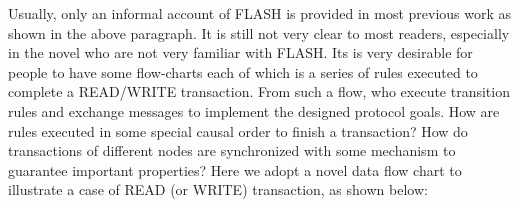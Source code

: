 \documentclass{llncs}
\begin{document}

%

Usually, only an informal  account of FLASH is provided in most previous work as shown in the above paragraph.   It is still not very clear to most readers, especially in the novel who are not very familiar with FLASH. Its is very desirable for people to have some flow-charts each of  which is a series of rules executed to complete a READ/WRITE transaction. From such a flow, who execute transition rules and exchange messages to implement the designed protocol goals. How  are rules executed in some special causal order to finish a transaction? How do transactions of different nodes are synchronized with some mechanism to guarantee  important properties? Here we adopt a novel data flow chart to illustrate a case of READ (or WRITE) transaction, as shown below:
\end{document}
